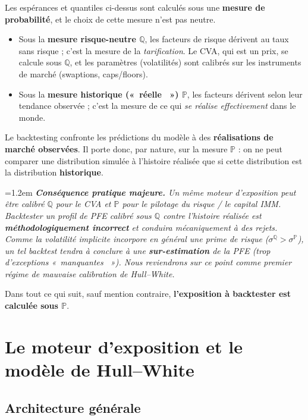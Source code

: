 \documentclass[11pt,a4paper]{article}
\providecommand{\og}{«~}
\providecommand{\fg}{~»}
\newcommand{\Prob}{\mathbb{P}}
\newcommand{\Qmeas}{\mathbb{Q}}
\newenvironment{remarque}
  {\par\smallskip\noindent\begin{minipage}{\linewidth}\leftskip=1.2em
   \footnotesize\itshape}
  {\end{minipage}\par\smallskip}
\theoremstyle{remark}
\begin{document}
Les espérances et quantiles ci-dessus sont calculés sous une \textbf{mesure de probabilité}, et le choix de cette mesure n'est pas neutre.
\begin{itemize}[nosep]
  \item Sous la \textbf{mesure risque-neutre $\Qmeas$}, les facteurs de risque dérivent au taux sans risque ; c'est la mesure de la \emph{tarification}. Le CVA, qui est un prix, se calcule sous $\Qmeas$, et les paramètres (volatilités) sont calibrés sur les instruments de marché (swaptions, caps/floors).
  \item Sous la \textbf{mesure historique (\og réelle \fg{}) $\Prob$}, les facteurs dérivent selon leur tendance observée ; c'est la mesure de ce qui \emph{se réalise effectivement} dans le monde.
\end{itemize}
Le backtesting confronte les prédictions du modèle à des \textbf{réalisations de marché observées}. Il porte donc, par nature, sur la mesure $\Prob$ : on ne peut comparer une distribution simulée à l'histoire réalisée que si cette distribution est la distribution \textbf{historique}.

\begin{remarque}
\textbf{Conséquence pratique majeure.} Un même moteur d'exposition peut être calibré $\Qmeas$ pour le CVA et $\Prob$ pour le pilotage du risque / le capital IMM. Backtester un profil de PFE calibré sous $\Qmeas$ contre l'histoire réalisée est \textbf{méthodologiquement incorrect} et conduira mécaniquement à des rejets. Comme la volatilité implicite incorpore en général une prime de risque ($\sigma^{\Qmeas} > \sigma^{\Prob}$), un tel backtest tendra à conclure à une \textbf{sur-estimation} de la PFE (trop d'exceptions \og manquantes \fg{}). Nous reviendrons sur ce point comme premier régime de mauvaise calibration de Hull--White.
\end{remarque}

\noindent Dans tout ce qui suit, sauf mention contraire, \textbf{l'exposition à backtester est calculée sous $\Prob$}.

\section{Le moteur d'exposition et le modèle de Hull--White}
\label{sec:moteur}

\subsection{Architecture générale}
\end{document}
